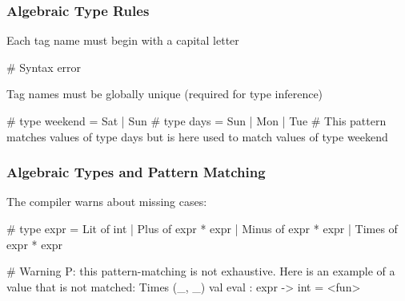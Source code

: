 \documentclass{plt}
\begin{document}
\begin{frame}[fragile]
  \frametitle{Algebraic Type Rules}

Each tag name must begin with a capital letter

\medskip

\begin{interactive}
# 
Syntax error
\end{interactive}

\medskip

Tag names must be globally unique (required for type inference)

\medskip

\begin{interactive}
# 
type weekend = Sat | Sun
# 
type days = Sun | Mon | Tue
# 
This pattern matches values of type days
but is here used to match values of type weekend
\end{interactive}

\end{frame}

\begin{frame}[fragile]
  \frametitle{Algebraic Types and Pattern Matching}

The compiler warns about missing cases:

\begin{interactive}
# 
type expr =
    Lit of int
  | Plus of expr * expr
  | Minus of expr * expr
  | Times of expr * expr

# 
Warning P: this pattern-matching is not exhaustive.
Here is an example of a value that is not matched:
Times (_, _)
val eval : expr -> int = <fun>
\end{interactive}

\end{frame}
\end{document}
